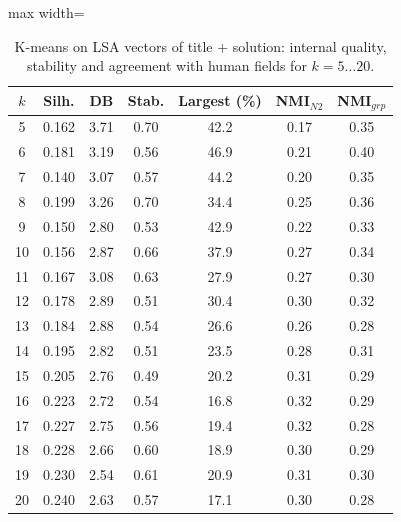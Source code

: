 \begin{table}[!t]
\centering
\caption{K-means on LSA vectors of title + solution: internal quality, stability and agreement with human fields for $k=5\ldots20$.}
\label{tab:sweep}
\footnotesize
\begin{adjustbox}{max width=\columnwidth}
\begin{tabular}{ccccccc}
\hline
$k$ & Silh. & DB & Stab. & Largest (\%) & NMI$_{N2}$ & NMI$_{grp}$ \\
\hline
5 & 0.162 & 3.71 & 0.70 & 42.2 & 0.17 & 0.35 \\
6 & 0.181 & 3.19 & 0.56 & 46.9 & 0.21 & 0.40 \\
7 & 0.140 & 3.07 & 0.57 & 44.2 & 0.20 & 0.35 \\
8 & 0.199 & 3.26 & 0.70 & 34.4 & 0.25 & 0.36 \\
9 & 0.150 & 2.80 & 0.53 & 42.9 & 0.22 & 0.33 \\
10 & 0.156 & 2.87 & 0.66 & 37.9 & 0.27 & 0.34 \\
11 & 0.167 & 3.08 & 0.63 & 27.9 & 0.27 & 0.30 \\
12 & 0.178 & 2.89 & 0.51 & 30.4 & 0.30 & 0.32 \\
13 & 0.184 & 2.88 & 0.54 & 26.6 & 0.26 & 0.28 \\
14 & 0.195 & 2.82 & 0.51 & 23.5 & 0.28 & 0.31 \\
15 & 0.205 & 2.76 & 0.49 & 20.2 & 0.31 & 0.29 \\
16 & 0.223 & 2.72 & 0.54 & 16.8 & 0.32 & 0.29 \\
17 & 0.227 & 2.75 & 0.56 & 19.4 & 0.32 & 0.28 \\
18 & 0.228 & 2.66 & 0.60 & 18.9 & 0.30 & 0.29 \\
19 & 0.230 & 2.54 & 0.61 & 20.9 & 0.31 & 0.30 \\
20 & 0.240 & 2.63 & 0.57 & 17.1 & 0.30 & 0.28 \\
\hline
\end{tabular}
\end{adjustbox}
\end{table}
